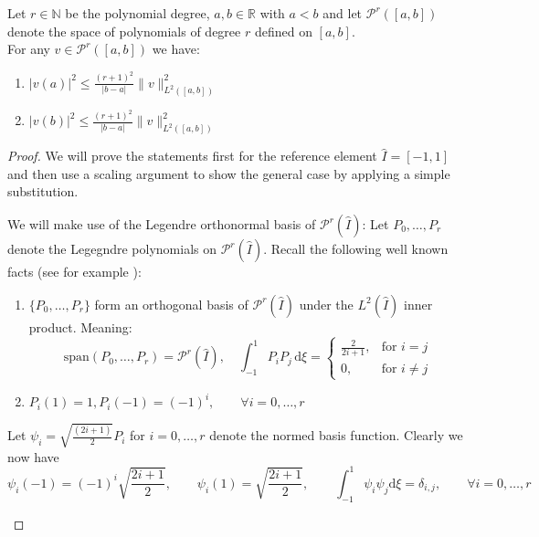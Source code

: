 \begin{lemma}
    \label{lemma:inv_ineq}
    Let $r\in \mathbb{N}$ be the polynomial degree, 
    $a,b\in \mathbb{R}$ with $a<b$ and let $\mathcal{P}^r([a,b])$ denote the 
    space of polynomials of degree $r$ defined on $[a,b]$. \\
    For any $v\in \mathcal{P}^r([a,b])$ we have:
    \begin{enumerate}
        \item $\displaystyle |v(a)|^2 \leq \frac{{(r+1)}^2}{|b-a|}\|v\|_{L^2([a,b])}^2$ 
        \item $\displaystyle |v(b)|^2 \leq \frac{{(r+1)}^2}{|b-a|}\|v\|_{L^2([a,b])}^2$
    \end{enumerate}
\end{lemma}
\begin{proof}
    We will prove the statements first for the reference element $\hat{I} = [-1,1]$ and then
    use a scaling argument to show the general case by applying a simple substitution. \\
    \begin{proofstep}[Setup]
        We will make 
        use of the Legendre orthonormal basis of $\mathcal{P}^r(\hat{I})$:
        Let $P_0,\ldots,P_r$ denote the Legegndre polynomials on  $\mathcal{P}^r(\hat{I})$. 
        Recall the following well known facts (see for example \cite{quarteroniNumericalMathematicSpringer2007}): 
        \begin{enumerate}
            \item $\{P_0,\ldots,P_r\}$ form an orthogonal basis of $\mathcal{P}^r(\hat{I})$ under the
            $L^2(\hat{I})$ inner product. Meaning:
            \[
            \text{span}(P_0,\ldots,P_r) = \mathcal{P}^r(\hat{I}),\quad \int_{-1}^{1} P_i P_j \,\text{d}\xi = 
            \begin{cases}
                \frac{2}{2i + 1}, &\text{for } i=j \\
                0, &\text{for } i\neq j   
            \end{cases} 
            \]    
            \item $P_i(1) = 1, P_i(-1) = {(-1)}^i, \qquad \forall i = 0,\ldots,r$
        \end{enumerate}
        Let $\psi_i = \sqrt{\frac{(2i + 1)}{2}}P_i$ for $i=0,\ldots,r$ denote the normed 
        basis function. Clearly we now have 
        \[
            \psi_i(-1) = {(-1)}^i\sqrt{\frac{2i+1}{2}}, \qquad \psi_i(1) = \sqrt{\frac{2i+1}{2}}, 
            \qquad \int_{-1}^{1}\psi_i \psi_j \text{d}\xi = \delta_{i,j}, \qquad \forall i = 0,\ldots,r
\]
\end{proofstep}
\end{proof}
